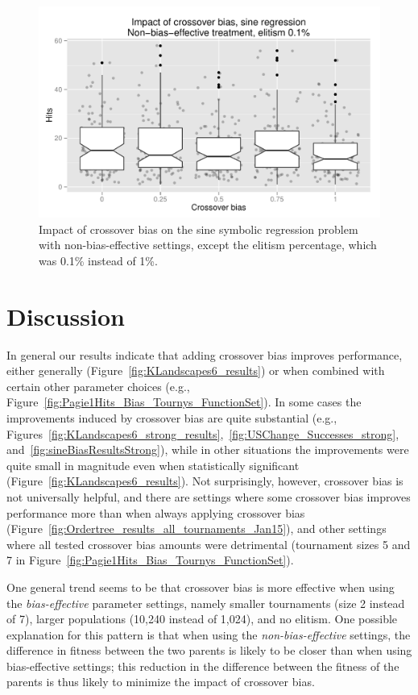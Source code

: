 \documentclass{sig-alternate}
\begin{document}

\begin{figure}
\centering
\includegraphics[width=0.45 \textwidth]{Plots/Sine_XO_impact_weak_boxplot.pdf}
\caption{Impact of crossover bias on the sine symbolic regression problem with non-bias-effective settings, 
	except the elitism percentage, which was 0.1\% instead of 1\%.}
\label{fig:sineBiasResultsWeak}
\end{figure}

\section{Discussion} \label{sec:Discussion}

In general our results indicate that adding crossover bias improves performance, either generally
(Figure~\ref{fig:KLandscapes6_results}) or when combined with certain other parameter choices (e.g.,
Figure~\ref{fig:Pagie1Hits_Bias_Tournys_FunctionSet}). In some cases the improvements induced by crossover bias are
quite substantial (e.g., Figures~\ref{fig:KLandscapes6_strong_results},~\ref{fig:USChange_Successes_strong},
and~\ref{fig:sineBiasResultsStrong}), while in other situations the improvements were quite small in magnitude even
when statistically significant (Figure~\ref{fig:KLandscapes6_results}). Not surprisingly, however, crossover bias is
not universally helpful, and there are settings where some crossover bias improves performance more than when always
applying crossover bias (Figure~\ref{fig:Ordertree_results_all_tournaments_Jan15}), and other settings where all tested
crossover bias amounts were detrimental (tournament sizes 5 and 7 in
Figure~\ref{fig:Pagie1Hits_Bias_Tournys_FunctionSet}).

One general trend seems to be that crossover bias is more effective when using the \emph{bias-effective} parameter
settings, namely smaller tournaments (size 2 instead of 7), larger populations (10,240 instead of 1,024), and no
elitism. One possible explanation for this pattern is that when using the \emph{non-bias-effective} settings, 
the difference in fitness between the two parents is likely to be
closer than when using bias-effective settings; this reduction in the difference between the fitness of the 
parents is thus likely to minimize the impact of crossover bias.
\end{document}
